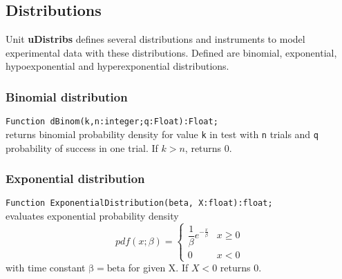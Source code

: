 \documentclass[12pt,a4paper,oneside]{article}
\newcommand{\code}[1]{\texttt{#1}}
\begin{document}
\subsection{Distributions}
Unit \textbf{uDistribs} defines several distributions and instruments to model experimental data with these distributions. Defined are binomial, exponential, hypoexponential and hyperexponential distributions.
\subsubsection{Binomial distribution}
\code{Function dBinom(k,n:integer;q:Float):Float;}\\
returns binomial probability density for value \code{k} in test with \code{n} trials and \code{q} probability of success in one trial. If $k>n$, returns 0. 
\subsubsection{Exponential distribution}
\code{Function ExponentialDistribution(beta, X:float):float;}\\
evaluates exponential probability density 
\begin{equation}
pdf(x;\beta)= 
\begin{cases} 
\dfrac{1}{\beta} e^{-\frac{x}{\beta}} & x\geq0 \\ 
0 & x<0
\end{cases}
\label{eq:exp_distrib}	
\end{equation}
with time constant $\mathrm{\beta = beta}$ for given X. If
$X < 0$ returns 0.
\end{document}
